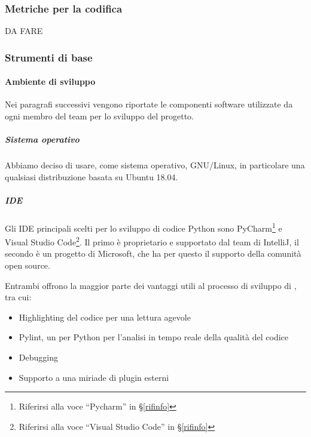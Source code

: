 

        \subsubsection{Metriche per la codifica} %
		DA FARE

        \subsubsection{Strumenti di base}\label{PP:Sviluppo:Strumenti}

	    \paragraph{Ambiente di sviluppo}\label{PP:Sviluppo:Strumenti:AmbienteSviluppo}
	    Nei paragrafi successivi vengono riportate le componenti software utilizzate da ogni membro del team per lo sviluppo del progetto.


	    \subparagraph{Sistema operativo}\label{PP:Sviluppo:Strumenti:AmbienteSviluppo:SistemaOperativo}
	    Abbiamo deciso di usare, come sistema operativo, GNU/Linux, in particolare una qualsiasi distribuzione basata su Ubuntu 18.04.

	    \subparagraph{IDE}\label{PP:Sviluppo:Strumenti:AmbienteSviluppo:IDE} %
		Gli IDE principali scelti per lo sviluppo di codice Python sono
		{PyCharm}\footnote{Riferirsi alla voce ``Pycharm'' in \S\ref{rifinfo}} e
		{Visual Studio Code}\footnote{Riferirsi alla voce ``Visual Studio Code'' in \S\ref{rifinfo}}.
		Il primo è proprietario e supportato dal team di IntelliJ, il secondo è un progetto  di Microsoft, che ha
		per questo il supporto della comunità open source.\par
		Entrambi offrono la maggior parte dei vantaggi utili al processo di sviluppo di \progetto, tra cui:
		\begin{itemize}
			\item Highlighting del codice per una lettura agevole
			\item Pylint, un  per Python per l'analisi in tempo reale della qualità del codice
			\item Debugging
			\item Supporto a una miriade di plugin esterni
		\end{itemize}

